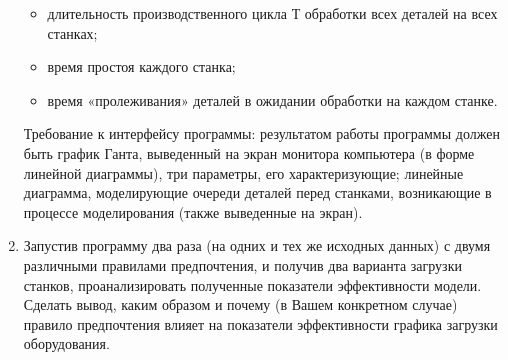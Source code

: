 \documentclass[a4paper,12pt]{article}
\begin{document}
\begin{flushleft}
\begin{enumerate}
  \begin{itemize}
  \item
    длительность производственного цикла Т обработки всех деталей на всех
    станках;
  \item
    время простоя каждого станка;
  \item
    время «пролеживания» деталей в ожидании обработки на каждом станке. 
  \end{itemize}

  Требование к интерфейсу программы: результатом работы программы должен
  быть график Ганта, выведенный на экран монитора компьютера (в форме
  линейной диаграммы), три параметры, его характеризующие; линейные
  диаграмма, моделирующие очереди деталей перед станками, возникающие в
  процессе моделирования (также выведенные на экран).

\item
  Запустив программу два раза (на одних и тех же исходных данных) с
  двумя различными правилами предпочтения, и получив два варианта
  загрузки станков, проанализировать полученные показатели эффективности
  модели. Сделать вывод, каким образом и почему (в Вашем конкретном
  случае) правило предпочтения влияет на показатели эффективности
  графика загрузки оборудования. 
\end{enumerate}
\end{flushleft}

\pagebreak
\end{document}
